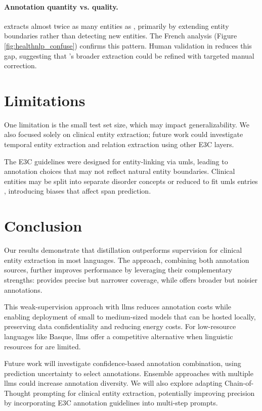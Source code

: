 \paragraph{Annotation quantity vs. quality.} \instruct extracts almost twice as many entities as \dict, primarily by extending entity boundaries rather than detecting new entities. The French analysis (Figure \ref{fig:healthnlp_confuse}) confirms this pattern. Human validation in \Sval reduces this gap, suggesting that \instruct's broader extraction could be refined with targeted manual correction.

\section{Limitations}
One limitation is the small test set size, which may impact generalizability. We also focused solely on clinical entity extraction; future work could investigate temporal entity extraction and relation extraction using other E3C layers.

The E3C guidelines were designed for entity-linking via \gls{umls}, leading to annotation choices that may not reflect natural entity boundaries. Clinical entities may be split into separate disorder concepts or reduced to fit \gls{umls} entries \citep{Magnini2020TheCases}, introducing biases that affect span prediction.

\section{Conclusion}
Our results demonstrate that \distilmodels distillation outperforms \weakModel supervision for clinical entity extraction in most languages. The \hybridmodel approach, combining both annotation sources, further improves performance by leveraging their complementary strengths: \dict provides precise but narrower coverage, while \instruct offers broader but noisier annotations.

This weak-supervision approach with \glspl{llm} reduces annotation costs while enabling deployment of small to medium-sized models that can be hosted locally, preserving data confidentiality and reducing energy costs. For low-resource languages like Basque, \glspl{llm} offer a competitive alternative when linguistic resources for \dict are limited.

Future work will investigate confidence-based annotation combination, using prediction uncertainty to select annotations. Ensemble approaches with multiple \glspl{llm} could increase annotation diversity. We will also explore adapting Chain-of-Thought prompting for clinical entity extraction, potentially improving \instruct precision by incorporating E3C annotation guidelines into multi-step prompts.
